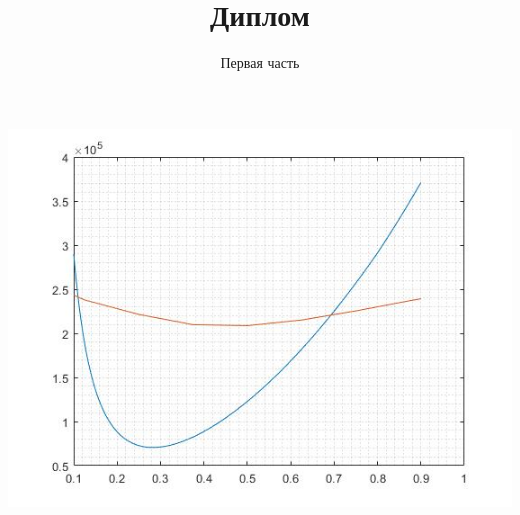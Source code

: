 \documentclass[a4paper,12pt]{article}
\title{Диплом}
\author{Первая часть}
\date{}
\begin{document}
 

 

\maketitle %

\includegraphics[width=1\textwidth]{img/1.jpg}

 
\end{document}

